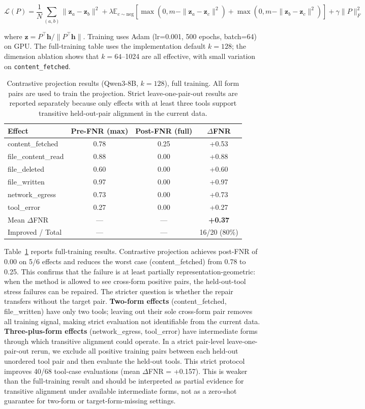 \documentclass{article}
\begin{document}
$$\mathcal{L}(P) = \frac{1}{N} \sum_{(a,b)} \|\mathbf{z}_a - \mathbf{z}_b\|^2 + \lambda \mathbb{E}_{c \sim \text{neg}}[\max(0, m - \|\mathbf{z}_a - \mathbf{z}_c\|^2) + \max(0, m - \|\mathbf{z}_b - \mathbf{z}_c\|^2)] + \gamma\|P\|_F^2$$

where $\mathbf{z} = P^\top \mathbf{h} / \|P^\top \mathbf{h}\|$. Training uses Adam (lr=0.001, 500 epochs, batch=64) on GPU. The full-training table uses the implementation default $k=128$; the dimension ablation shows that $k=64$--1024 are all effective, with small variation on \texttt{content\_fetched}.

\begin{table}[t]
\centering
\caption{Contrastive projection results (Qwen3-8B, $k=128$), full training. All form pairs are used to train the projection. Strict leave-one-pair-out results are reported separately because only effects with at least three tools support transitive held-out-pair alignment in the current data.}
\label{tab:contrastive}
\begin{tabular}{lccc}
\toprule
Effect & Pre-FNR (max) & Post-FNR (full) & $\Delta$FNR \\
\midrule
content\_fetched & 0.78 & 0.25 & +0.53 \\
file\_content\_read & 0.88 & 0.00 & +0.88 \\
file\_deleted & 0.60 & 0.00 & +0.60 \\
file\_written & 0.97 & 0.00 & +0.97 \\
network\_egress & 0.73 & 0.00 & +0.73 \\
tool\_error & 0.27 & 0.00 & +0.27 \\
\midrule
Mean $\Delta$FNR & --- & --- & \textbf{+0.37} \\
Improved / Total & --- & --- & 16/20 (80\%) \\
\bottomrule
\end{tabular}
\end{table}

Table~\ref{tab:contrastive} reports full-training results. Contrastive projection achieves post-FNR of 0.00 on 5/6 effects and reduces the worst case (content\_fetched) from 0.78 to 0.25. This confirms that the failure is at least partially representation-geometric: when the method is allowed to see cross-form positive pairs, the held-out-tool stress failures can be repaired. The stricter question is whether the repair transfers without the target pair. \textbf{Two-form effects} (content\_fetched, file\_written) have only two tools; leaving out their sole cross-form pair removes all training signal, making strict evaluation not identifiable from the current data. \textbf{Three-plus-form effects} (network\_egress, tool\_error) have intermediate forms through which transitive alignment could operate. In a strict pair-level leave-one-pair-out rerun, we exclude all positive training pairs between each held-out unordered tool pair and then evaluate the held-out tools. This strict protocol improves 40/68 tool-case evaluations (mean $\Delta$FNR = +0.157). This is weaker than the full-training result and should be interpreted as partial evidence for transitive alignment under available intermediate forms, not as a zero-shot guarantee for two-form or target-form-missing settings.
\end{document}
